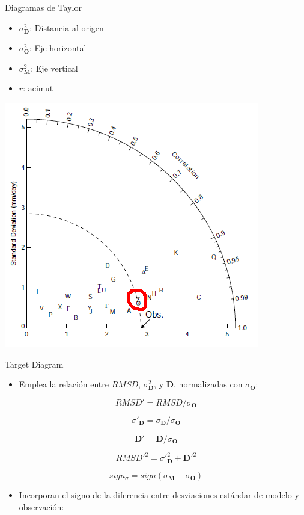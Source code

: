 \documentclass[xcolor={usenames,svgnames,dvipsnames}]{beamer}
\begin{document}
\begin{frame}[label={sec:orga7cbbbd}]{Diagramas de Taylor}
\begin{itemize}
\item \(\sigma^2_{\mathbf{D}}\): Distancia al origen
\item \(\sigma^2_{\mathbf{O}}\): Eje horizontal
\item \(\sigma^2_{\mathbf{M}}\): Eje vertical
\item \(r\): acimut
\end{itemize}
\begin{center}
\begin{center}
\includegraphics[height=0.6\textheight]{../figs/TaylorDiagrama.png}
\end{center}
\end{center}
\end{frame}


\begin{frame}[label={sec:org0acaeec}]{Target Diagram}
\begin{itemize}
\item Emplea la relación entre \(RMSD\), \(\sigma^2_{\mathbf{D}}\), y \(\overline{\mathbf{D}}\), normalizadas con \(\sigma_{\mathbf{O}}\):
\end{itemize}
\[
RMSD' = RMSD / \sigma_{\mathbf{O}}
\]

\[
  \sigma'_{\mathbf{D}} = \sigma_{\mathbf{D}} / \sigma_{\mathbf{O}} 
\]

\[
\overline{\mathbf{D}}' = \overline{\mathbf{D}} / \sigma_{\mathbf{O}}
\]

\[
RMSD'^2= \sigma'^2_{\mathbf{D}} + \overline{\mathbf{D}}'^2
\]

\[
sign_{\sigma} =  sign(\sigma_{\mathbf{M}} - \sigma_{\mathbf{O}} )
\]

\begin{itemize}
\item Incorporan el signo de la diferencia entre desviaciones estándar de modelo y observación:
\end{itemize}

\nocite{Jolliff.Kindle.ea2009}
\end{frame}
\end{document}
